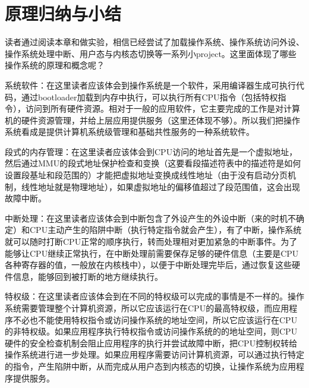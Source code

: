 \section{原理归纳与小结}\label{ux539fux7406ux5f52ux7eb3ux4e0eux5c0fux7ed3}

读者通过阅读本章和做实验，相信已经尝试了加载操作系统、操作系统访问外设、操作系统处理中断、用户态与内核态切换等一系列小project。这里面体现了哪些操作系统的原理和概念呢？

系统软件：在这里读者应该体会到操作系统是一个软件，采用编译器生成可执行代码，通过bootloader加载到内存中执行，可以执行所有CPU指令（包括特权指令），访问到所有硬件资源。相对于一般的应用软件，它主要完成的工作是对计算机的硬件资源管理，并给上层应用提供服务（这里还体现不够）。所以我们把操作系统看成是提供计算机系统级管理和基础共性服务的一种系统软件。

段式的内存管理：在这里读者应该体会到CPU访问的地址首先是一个虚拟地址，然后通过MMU的段式地址保护检查和变换（这要看段描述符表中的描述符是如何设置段基址和段范围的）才能把虚拟地址变换成线性地址（由于没有启动分页机制，线性地址就是物理地址），如果虚拟地址的偏移值超过了段范围值，这会出现故障中断。

中断处理：在这里读者应该体会到中断包含了外设产生的外设中断（来的时机不确定）和CPU主动产生的陷阱中断（执行特定指令就会产生），有了中断，操作系统就可以随时打断CPU正常的顺序执行，转而处理相对更加紧急的中断事件。为了能够让CPU继续正常执行，在中断处理前需要保存足够的硬件信息（主要是CPU各种寄存器的值，一般放在内核栈中），以便于中断处理完毕后，通过恢复这些硬件信息，能够回到被打断的地方继续执行。

特权级：在这里读者应该体会到在不同的特权级可以完成的事情是不一样的。操作系统需要管理整个计算机资源，所以它应该运行在CPU的最高特权级，而应用程序不必也不能使用特权指令或访问操作系统的地址空间，所以它应该运行在CPU的非特权级。如果应用程序执行特权指令或访问操作系统的的地址空间，则CPU硬件的安全检查机制会阻止应用程序的执行并尝试故障中断，把CPU控制权转给操作系统进行进一步处理。如果应用程序需要访问计算机资源，可以通过执行特定的指令，产生陷阱中断，从而完成从用户态到内核态的切换，让操作系统为应用程序提供服务。
